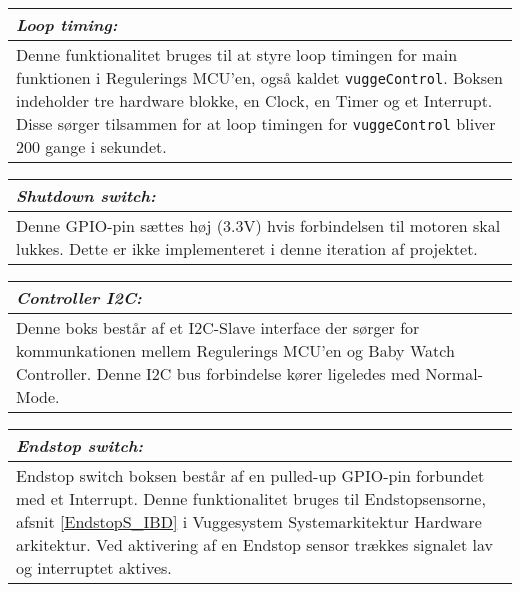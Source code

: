 \begin{center}
    \begin{tabular}{| p{14.5cm} |}
    \hline
    \label{vuggesystem: impl,Loop timing} \textit{Loop timing:} \\ \hline
    Denne funktionalitet bruges til at styre loop timingen for main funktionen i Regulerings MCU'en, også kaldet \verb+vuggeControl+. Boksen indeholder tre hardware blokke, en Clock, en Timer og et Interrupt. Disse sørger tilsammen for at loop timingen for \verb+vuggeControl+ bliver 200 gange i sekundet. \\   \hline
    \end{tabular}
\end{center}

\begin{center}
    \begin{tabular}{| p{14.5cm} |}
    \hline
    \textit{Shutdown switch:} \\ \hline
    Denne GPIO-pin sættes høj (3.3V) hvis forbindelsen til motoren skal lukkes. Dette er ikke implementeret i denne iteration af projektet.  \\ \hline
    \end{tabular}
\end{center}

\begin{center}
    \begin{tabular}{| p{14.5cm} |}
    \hline
    \textit{Controller I2C:} \\ \hline
    Denne boks består af et I2C-Slave interface der sørger for kommunkationen mellem Regulerings MCU'en og Baby Watch Controller. Denne I2C bus forbindelse kører ligeledes med Normal-Mode. \\ \hline
    \end{tabular}
\end{center}

\begin{center}
    \begin{tabular}{| p{14.5cm} |}
    \hline
    \textit{Endstop switch:} \\ \hline
   Endstop switch boksen består af en pulled-up GPIO-pin forbundet med et Interrupt. Denne funktionalitet bruges til Endstopsensorne, afsnit \vref{EndstopS_IBD} i Vuggesystem Systemarkitektur Hardware arkitektur. Ved aktivering af en Endstop sensor trækkes signalet lav og interruptet aktives. \\ \hline
    \end{tabular}
\end{center}

